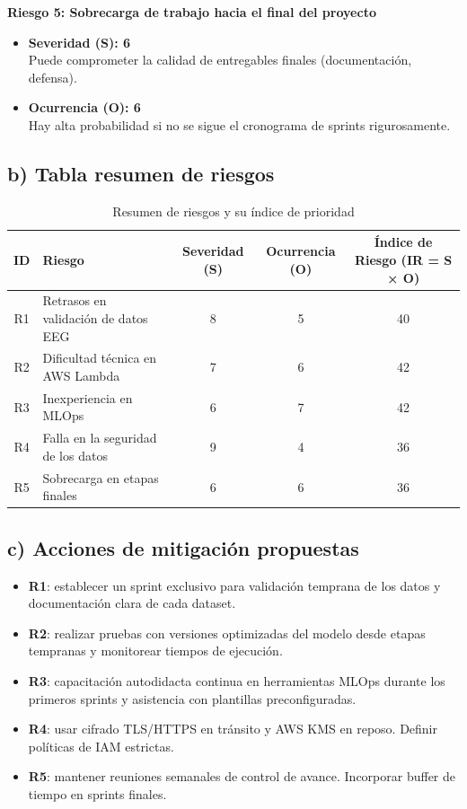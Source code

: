 \documentclass[
11pt, %
]{charter}
\begin{document}
\textbf{Riesgo 5: Sobrecarga de trabajo hacia el final del proyecto}
\begin{itemize}
    \item \textbf{Severidad (S): 6} \\
    Puede comprometer la calidad de entregables finales (documentación, defensa).
    \item \textbf{Ocurrencia (O): 6} \\
    Hay alta probabilidad si no se sigue el cronograma de sprints rigurosamente.
\end{itemize}

\subsection*{b) Tabla resumen de riesgos}

\begin{table}[H]
\centering
\begin{tabularx}{\linewidth}{|c|X|c|c|c|}
\hline
\rowcolor[HTML]{C0C0C0}
\textbf{ID} & \textbf{Riesgo} & \textbf{Severidad (S)} & \textbf{Ocurrencia (O)} & \textbf{Índice de Riesgo (IR = S × O)} \\
\hline
R1 & Retrasos en validación de datos EEG & 8 & 5 & 40 \\
\hline
R2 & Dificultad técnica en AWS Lambda & 7 & 6 & 42 \\
\hline
R3 & Inexperiencia en MLOps & 6 & 7 & 42 \\
\hline
R4 & Falla en la seguridad de los datos & 9 & 4 & 36 \\
\hline
R5 & Sobrecarga en etapas finales & 6 & 6 & 36 \\
\hline
\end{tabularx}
\caption{Resumen de riesgos y su índice de prioridad}
\end{table}

\vspace{0.5cm}

\subsection*{c) Acciones de mitigación propuestas}

\begin{itemize}
  \item \textbf{R1}: establecer un sprint exclusivo para validación temprana de los datos y documentación clara de cada dataset.
  \item \textbf{R2}: realizar pruebas con versiones optimizadas del modelo desde etapas tempranas y monitorear tiempos de ejecución.
  \item \textbf{R3}: capacitación autodidacta continua en herramientas MLOps durante los primeros sprints y asistencia con plantillas preconfiguradas.
  \item \textbf{R4}: usar cifrado TLS/HTTPS en tránsito y AWS KMS en reposo. Definir políticas de IAM estrictas.
  \item \textbf{R5}: mantener reuniones semanales de control de avance. Incorporar buffer de tiempo en sprints finales.
\end{itemize}
\end{document}
